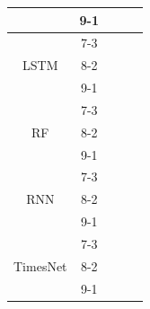 \documentclass{ieeeojies}
\begin{document}
\begin{table}[H]
\begin{tabular}{|ccccc|}
  \multicolumn{1}{|c|}{}                                   & \multicolumn{1}{c|}{9-1}        & \multicolumn{1}{c|}{}        & \multicolumn{1}{c|}{}          &       \\ \hline
  \multicolumn{1}{|c|}{\multirow{3}{*}{LSTM}}              & \multicolumn{1}{c|}{7-3}            & \multicolumn{1}{c|}{}  & \multicolumn{1}{c|}{}      &  \\ \cline{2-5} 
  \multicolumn{1}{|c|}{}                                   & \multicolumn{1}{c|}{8-2}        & \multicolumn{1}{c|}{}  & \multicolumn{1}{c|}{}      &  \\ \cline{2-5} 
  \multicolumn{1}{|c|}{}                                   & \multicolumn{1}{c|}{9-1}        & \multicolumn{1}{c|}{}  & \multicolumn{1}{c|}{}      &  \\ \hline
  \multicolumn{1}{|c|}{\multirow{3}{*}{RF}}                & \multicolumn{1}{c|}{7-3}            & \multicolumn{1}{c|}{}        & \multicolumn{1}{c|}{}          &       \\ \cline{2-5} 
  \multicolumn{1}{|c|}{}                                   & \multicolumn{1}{c|}{8-2}        & \multicolumn{1}{c|}{}        & \multicolumn{1}{c|}{}          &       \\ \cline{2-5} 
  \multicolumn{1}{|c|}{}                                   & \multicolumn{1}{c|}{9-1}        & \multicolumn{1}{c|}{}        & \multicolumn{1}{c|}{}          &       \\ \hline
  \multicolumn{1}{|c|}{\multirow{3}{*}{RNN}}               & \multicolumn{1}{c|}{7-3}            & \multicolumn{1}{c|}{}        & \multicolumn{1}{c|}{}          &       \\ \cline{2-5} 
  \multicolumn{1}{|c|}{}                                   & \multicolumn{1}{c|}{8-2}        & \multicolumn{1}{c|}{}        & \multicolumn{1}{c|}{}          &       \\ \cline{2-5} 
  \multicolumn{1}{|c|}{}                                   & \multicolumn{1}{c|}{9-1}        & \multicolumn{1}{c|}{}        & \multicolumn{1}{c|}{}          &       \\ \hline
  \multicolumn{1}{|c|}{\multirow{3}{*}{TimesNet}}          & \multicolumn{1}{c|}{7-3}            & \multicolumn{1}{c|}{} & \multicolumn{1}{c|}{}     &  \\ \cline{2-5} 
  \multicolumn{1}{|c|}{}                                   & \multicolumn{1}{c|}{8-2}        & \multicolumn{1}{c|}{} & \multicolumn{1}{c|}{}     &  \\ \cline{2-5} 
  \multicolumn{1}{|c|}{}                                   & \multicolumn{1}{c|}{9-1}        & \multicolumn{1}{c|}{} & \multicolumn{1}{c|}{}     &  \\ \hline

\end{tabular}
\end{table}
\end{document}
